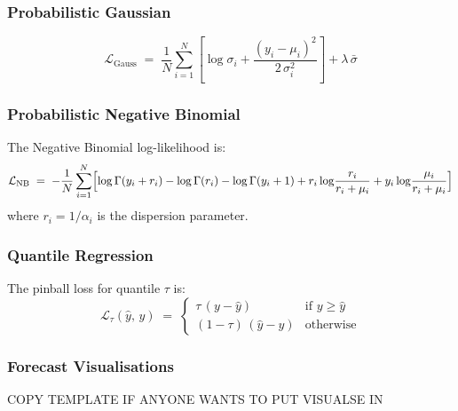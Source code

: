 \documentclass[runningheads,oneside]{llncs}
\begin{document}
\subsubsection*{Probabilistic Gaussian}
\begin{equation}
    \mathcal{L}_{\mathrm{Gauss}}
    \;=\;
    \frac{1}{N} \sum_{i=1}^{N}
    \left[
        \log \sigma_i
        + \frac{(y_i - \mu_i)^2}{2\,\sigma_i^2}
    \right]
    + \lambda\,\bar{\sigma}
    \label{eq:gauss_nll}
\end{equation}


\subsubsection*{Probabilistic Negative Binomial}

The Negative Binomial log-likelihood is:
%
\begin{equation}
    \mathcal{L}_{\mathrm{NB}}
    \;=\;
    -\frac{1}{N} \sum_{i=1}^{N}
    \Bigl[
        \log\Gamma(y_i + r_i)
        - \log\Gamma(r_i)
        - \log\Gamma(y_i + 1)
        + r_i \log\!\frac{r_i}{r_i + \mu_i}
        + y_i \log\!\frac{\mu_i}{r_i + \mu_i}
    \Bigr]
    \label{eq:nb_nll}
\end{equation}
%
where $r_i = 1/\alpha_i$ is the dispersion parameter.

\subsubsection*{Quantile Regression}

The pinball loss for quantile $\tau$ is:
%
\begin{equation}
    \mathcal{L}_{\tau}(\hat{y},\, y)
    \;=\;
    \begin{cases}
        \tau\,(y - \hat{y})       & \text{if } y \geq \hat{y} \\[4pt]
        (1 - \tau)\,(\hat{y} - y) & \text{otherwise}
    \end{cases}
    \label{eq:pinball}
\end{equation}



\subsubsection*{Forecast Visualisations}
COPY TEMPLATE IF ANYONE WANTS TO PUT VISUALSE IN
\end{document}
